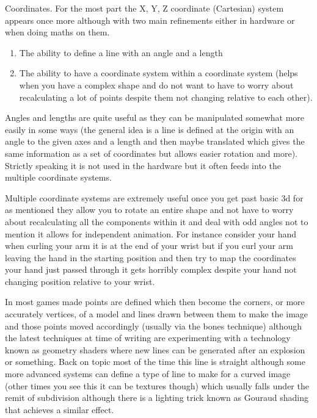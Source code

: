 \documentclass[
]{book}
\providecommand{\tightlist}{%
  \setlength{\itemsep}{0pt}\setlength{\parskip}{0pt}}
\begin{document}
Coordinates. For the most part the X, Y, Z coordinate (Cartesian) system appears once more although with two main refinements either in hardware or when doing maths on them.

\begin{enumerate}
\def\labelenumi{\arabic{enumi}.}
\tightlist
\item
  The ability to define a line with an angle and a length
\item
  The ability to have a coordinate system within a coordinate system (helps when you have a complex shape and do not want to have to worry about recalculating a lot of points despite them not changing relative to each other).
\end{enumerate}

Angles and lengths are quite useful as they can be manipulated somewhat more easily in some ways (the general idea is a line is defined at the origin with an angle to the given axes and a length and then maybe translated which gives the same information as a set of coordinates but allows easier rotation and more). Strictly speaking it is not used in the hardware but it often feeds into the multiple coordinate systems.

Multiple coordinate systems are extremely useful once you get past basic 3d for as mentioned they allow you to rotate an entire shape and not have to worry about recalculating all the components within it and deal with odd angles not to mention it allows for independent animation. For instance consider your hand when curling your arm it is at the end of your wrist but if you curl your arm leaving the hand in the starting position and then try to map the coordinates your hand just passed through it gets horribly complex despite your hand not changing position relative to your wrist.

In most games made points are defined which then become the corners, or more accurately vertices, of a model and lines drawn between them to make the image and those points moved accordingly (usually via the bones technique) although the latest techniques at time of writing are experimenting with a technology known as geometry shaders where new lines can be generated after an explosion or something. Back on topic most of the time this line is straight although some more advanced systems can define a type of line to make for a curved image (other times you see this it can be textures though) which usually falls under the remit of subdivision although there is a lighting trick known as Gouraud shading that achieves a similar effect.
\end{document}
